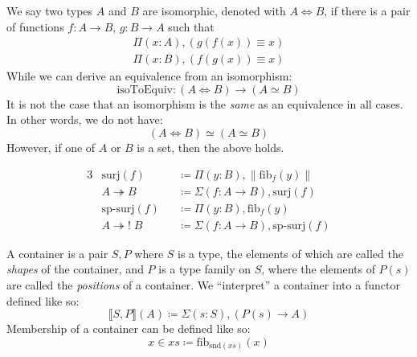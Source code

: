 \begin{romdefinition}[Isomorphism] \label{isomorphism}
  We say two types \(A\) and \(B\) are isomorphic, denoted with \(A \iff B\), if
  there is a pair of functions \(f : A \rightarrow B\), \(g : B \rightarrow A\)
  such that
  \begin{equation}
    \begin{aligned}
      \Pi(x : A) , (g(f(x)) \equiv x) \\
      \Pi(x : B) , (f(g(x)) \equiv x)
    \end{aligned}
  \end{equation}
  While we can derive an equivalence from an isomorphism:
  \begin{equation}
    \text{isoToEquiv} : (A \iff B) \rightarrow (A \simeq B)
  \end{equation}
  It is not the case that an isomorphism is the \emph{same} as an equivalence in
  all cases.
  In other words, we do not have:
  \begin{equation}
    (A \iff B) \simeq (A \simeq B)
  \end{equation}
  However, if one of \(A\) or \(B\) is a set, then the above holds.
\end{romdefinition}
\begin{romdefinition} \label{HITs}
\end{romdefinition}
\begin{romdefinition}[Surjections] \label{surjections}
  \begin{alignat}{3}
    &\text{surj}(f)             &&\coloneqq \Pi(y : B) , \lVert \text{fib}_f(y) \rVert \\
    &A \twoheadrightarrow B     &&\coloneqq \Sigma (f : A \rightarrow B) , \text{surj}(f) \\
    &\text{sp-surj}(f)          &&\coloneqq \Pi(y : B) , \text{fib}_f(y) \label{sp-surj-eqn} \\
    &A \twoheadrightarrow! \; B &&\coloneqq \Sigma (f : A \rightarrow B) , \text{sp-surj}(f) \label{sp-surj-arrow-eqn}
  \end{alignat}
\end{romdefinition}
\begin{romdefinition}[Containers] \label{container-def}
  A container \cite{abbottContainersConstructingStrictly2005} is a pair
  \(S , P\) where \(S\) is a type, the elements of which are called
  the \emph{shapes} of the container, and \(P\) is a type family on \(S\), where
  the elements of \(P(s)\) are called the \emph{positions} of a container.
  We ``interpret'' a container into a functor defined like so:
  \begin{equation} \label{container-interp}
    \llbracket S , P \rrbracket(A) \coloneqq \Sigma {(s : S)} , \left( P(s) \rightarrow A \right)
  \end{equation}
  Membership of a container can be defined like so:
  \begin{equation} \label{container-membership}
    x \in \mathit{xs} \coloneqq \text{fib}_{\text{snd}(\mathit{xs})}(x)
  \end{equation}
\end{romdefinition}
